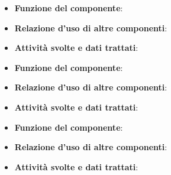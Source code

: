 \begin{itemize}
	\item\textbf{Funzione del componente}: 
	\item\textbf{Relazione d'uso di altre componenti}: 
	\item\textbf{Attività svolte e dati trattati}:
\end{itemize}

\begin{itemize}
	\item\textbf{Funzione del componente}: 
	\item\textbf{Relazione d'uso di altre componenti}: 
	\item\textbf{Attività svolte e dati trattati}:
\end{itemize}

\begin{itemize}
	\item\textbf{Funzione del componente}: 
	\item\textbf{Relazione d'uso di altre componenti}: 
	\item\textbf{Attività svolte e dati trattati}:
\end{itemize}

